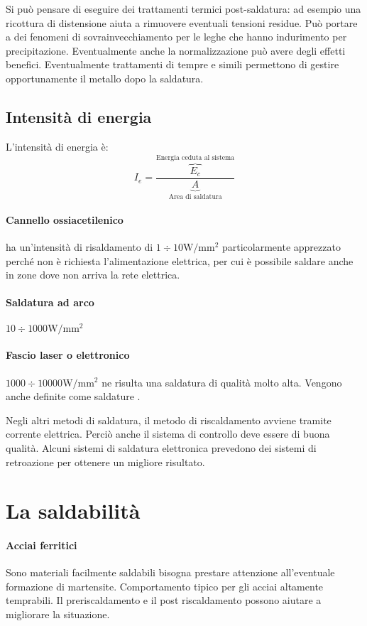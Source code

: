 Si può pensare di eseguire dei trattamenti termici post-saldatura: ad esempio una ricottura di distensione aiuta a rimuovere eventuali tensioni residue. Può portare a dei fenomeni di sovrainvecchiamento per le leghe che hanno indurimento per precipitazione.
Eventualmente anche la normalizzazione può avere degli effetti benefici.
Eventualmente trattamenti di tempre e simili permettono di gestire opportunamente il metallo dopo la saldatura.

\subsection{Intensità di energia}
L'intensità di energia è:
\begin{equation}
I_e = \frac{\overbrace{E_c}^{\text{Energia ceduta al sistema}}}{\underbrace{A}_{\text{Area di saldatura}}}
\end{equation}

\paragraph{Cannello ossiacetilenico} ha un'intensità di risaldamento di $1 \div 10 \unit{\W/\mm^2}$ particolarmente apprezzato perché non è richiesta l'alimentazione elettrica, per cui è possibile saldare anche in zone dove non arriva la rete elettrica.
\paragraph{Saldatura ad arco} $10 \div 1000 \unit{\W/\mm^2}$  
\paragraph{Fascio laser o elettronico} $1000 \div 10000 \unit{\W/\mm^2}$ ne risulta una saldatura di qualità molto alta. Vengono anche definite come saldature .

Negli altri metodi di saldatura, il metodo di riscaldamento avviene tramite corrente elettrica. Perciò anche il sistema di controllo deve essere di buona qualità. Alcuni sistemi di saldatura elettronica prevedono dei sistemi di retroazione per ottenere un migliore risultato.

\section{La saldabilità}
\paragraph{Acciai ferritici} Sono materiali facilmente saldabili bisogna prestare attenzione all'eventuale formazione di martensite. Comportamento tipico per gli acciai altamente temprabili.
Il preriscaldamento e il post riscaldamento possono aiutare a migliorare la situazione.
